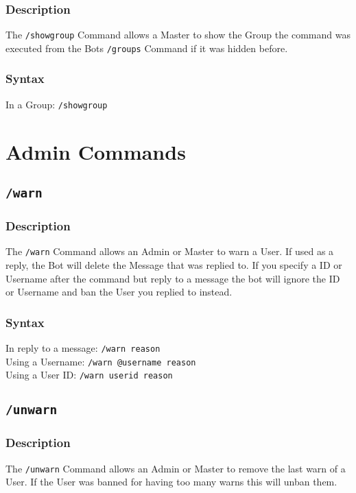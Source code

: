 \documentclass[a4paper]{article}
\begin{document}
        \subsubsection*{Description}
            The \texttt{/showgroup} Command allows a Master to show the Group the command was executed from the Bots \texttt{/groups} Command if it was hidden before.

        \subsubsection*{Syntax}
            In a Group: \texttt{/showgroup}



\section{Admin Commands}

    \subsection{\texttt{/warn}}
        \subsubsection*{Description}
            The \texttt{/warn} Command allows an Admin or Master to warn a User. If used as a reply, the Bot will delete the Message that was replied to. If you specify a ID or Username after the command but reply to a message the bot will ignore the ID or Username and ban the User you replied to instead.

        \subsubsection*{Syntax}
            In reply to a message: \texttt{/warn reason}\\
            Using a Username: \texttt{/warn @username reason}\\
            Using a User ID: \texttt{/warn userid reason}

    \subsection{\texttt{/unwarn}}
        \subsubsection*{Description}
            The \texttt{/unwarn} Command allows an Admin or Master to remove the last warn of a User. If the User was banned for having too many warns this will unban them.
\end{document}
